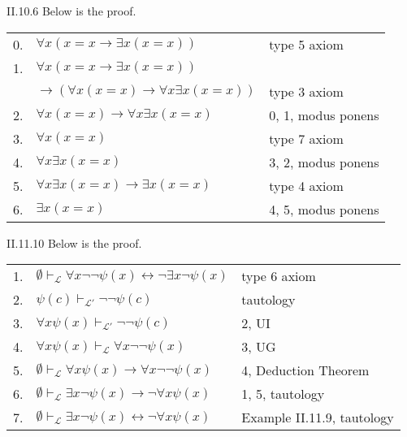 \documentclass[12pt]{article}
\begin{document}
\begin{customthm}{II.10.6}
  Below is the proof.
  \begin{center}
    \begin{tabular}{lll}
      0. & $\forall x(x=x\rightarrow\exists x(x=x))$ & type 5 axiom \\
      1. & $\forall x(x=x\rightarrow\exists x(x=x))$ & \\
      & $\rightarrow(\forall x(x=x)\rightarrow\forall x\exists x(x=x))$ & type 3 axiom \\
      2. & $\forall x(x=x)\rightarrow\forall x\exists x(x=x)$ & 0, 1, modus ponens \\
      3. & $\forall x(x=x)$ & type 7 axiom \\
      4. & $\forall x\exists x(x=x)$ & 3, 2, modus ponens \\
      5. & $\forall x\exists x(x=x)\rightarrow\exists x(x=x)$ & type 4 axiom \\
      6. & $\exists x(x=x)$ & 4, 5, modus ponens
    \end{tabular}
  \end{center}
\end{customthm}

\begin{customthm}{II.11.10}
  Below is the proof.
  \begin{center}
    \begin{tabular}{lll}
      1. & $\emptyset\vdash_\mathcal{L}\forall x\neg\neg\psi(x)\leftrightarrow\neg\exists x\neg\psi(x)$ & type 6 axiom \\
      2. & $\psi(c)\vdash_{\mathcal{L}'}\neg\neg\psi(c)$ & tautology \\
      3. & $\forall x\psi(x)\vdash_{\mathcal{L}'}\neg\neg\psi(c)$ & 2, UI \\
      4. & $\forall x\psi(x)\vdash_\mathcal{L}\forall x\neg\neg\psi(x)$ & 3, UG \\
      5. & $\emptyset\vdash_\mathcal{L}\forall x\psi(x)\rightarrow\forall x\neg\neg\psi(x)$ & 4, Deduction Theorem \\
      6. & $\emptyset\vdash_\mathcal{L}\exists x\neg\psi(x)\rightarrow\neg\forall x\psi(x)$ & 1, 5, tautology \\
      7. & $\emptyset\vdash_\mathcal{L}\exists x\neg\psi(x)\leftrightarrow\neg\forall x\psi(x)$ & Example II.11.9, tautology
    \end{tabular}
  \end{center}
\end{customthm}
\end{document}
